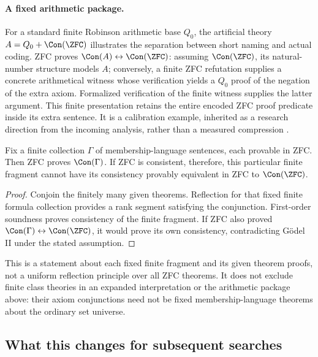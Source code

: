 \paragraph{A fixed arithmetic package.}
For a standard finite Robinson arithmetic base $Q_0$, the artificial
theory $A=Q_0+\Con(\ZFC)$ illustrates the separation between short naming
and actual coding.  ZFC proves $\Con(A)\leftrightarrow\Con(\ZFC)$:
assuming $\Con(\ZFC)$, its natural-number structure models $A$; conversely,
a finite ZFC refutation supplies a concrete arithmetical witness whose
verification yields a $Q_0$ proof of the negation of the extra axiom.
Formalized verification of the finite witness supplies the latter argument.
This finite presentation retains the entire encoded ZFC proof predicate
inside its extra sentence.  It is a calibration example, inherited as a
research direction from the incoming analysis, rather than a measured
compression \cite{incomingC}.

\begin{proposition}
Fix a finite collection $\Gamma$ of membership-language sentences, each
provable in ZFC.  Then ZFC proves $\Con(\Gamma)$.  If ZFC is consistent,
therefore, this particular finite fragment cannot have its consistency
provably equivalent in ZFC to $\Con(\ZFC)$.
\end{proposition}
\begin{proof}
Conjoin the finitely many given theorems.  Reflection for that fixed finite
formula collection provides a rank segment satisfying the conjunction.
First-order soundness proves consistency of the finite fragment.  If ZFC
also proved $\Con(\Gamma)\leftrightarrow\Con(\ZFC)$, it would prove its
own consistency, contradicting G\"odel II under the stated assumption.
\end{proof}

This is a statement about each fixed finite fragment and its given theorem
proofs, not a uniform reflection principle over all ZFC theorems.  It does
not exclude finite class theories in an expanded interpretation or the
arithmetic package above: their axiom conjunctions need not be fixed
membership-language theorems about the ordinary set universe.



\subsection{What this changes for subsequent searches}

